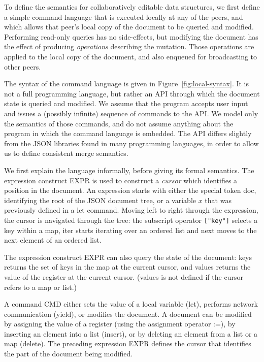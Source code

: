 \documentclass[10pt,journal,compsoc]{IEEEtran}
\begin{document}
To define the semantics for collaboratively editable data structures, we first define a simple command language that is executed locally at any of the peers, and which allows that peer's local copy of the document to be queried and modified. Performing read-only queries has no side-effects, but modifying the document has the effect of producing \emph{operations} describing the mutation. Those operations are applied to the local copy of the document, and also enqueued for broadcasting to other peers.

The syntax of the command language is given in Figure~\ref{fig:local-syntax}. It is not a full programming language, but rather an API through which the document state is queried and modified. We assume that the program accepts user input and issues a (possibly infinite) sequence of commands to the API. We model only the semantics of those commands, and do not assume anything about the program in which the command language is embedded. The API differs slightly from the JSON libraries found in many programming languages, in order to allow us to define consistent merge semantics.

We first explain the language informally, before giving its formal semantics. The expression construct EXPR is used to construct a \emph{cursor} which identifies a position in the document. An expression starts with either the special token \textsf{doc}, identifying the root of the JSON document tree, or a variable $x$ that was previously defined in a \textsf{let} command. Moving left to right through the expression, the cursor is navigated through the tree: the subscript operator \verb|["key"]| selects a key within a map, \textsf{iter} starts iterating over an ordered list and \textsf{next} moves to the next element of an ordered list.

The expression construct EXPR can also query the state of the document: \textsf{keys} returns the set of keys in the map at the current cursor, and \textsf{values} returns the value of the register at the current cursor. (\textsf{values} is not defined if the cursor refers to a map or list.)

A command CMD either sets the value of a local variable (\textsf{let}), performs network communication (\textsf{yield}), or modifies the document. A document can be modified by assigning the value of a register (using the assignment operator :=), by inserting an element into a list (\textsf{insert}), or by deleting an element from a list or a map (\textsf{delete}). The preceding expression EXPR defines the cursor that identifies the part of the document being modified.
\end{document}
